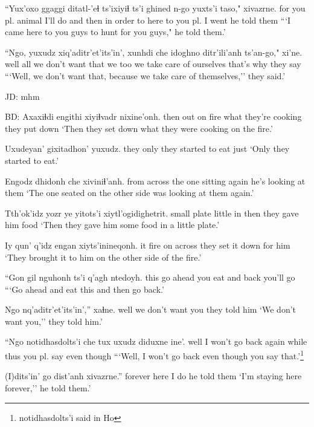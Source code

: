 \documentclass[12pt]{article}
\begin{document}
\gll ``Yux'oxo     ggaggi ditatl-'eɬ ts'ixiyiɬ {ts'i ghined} n-go yuxts'i    taso," xivazrne.
 {for you pl.} animal {I'll do}    {and then}    {in order to}      here {to you pl.} {I went} {he told them}
\glt ```I came here to you guys to hunt for you guys," he told them.'
\glend

\gll ``Ngo, yuxudz xiq'aditr'et'its'in', xunhdi che {idoghno ditr'ili'anh}      ts'an-go," xi'ne.
 well all    {we don't want that}   we     too {we take care of ourselves} {that's why} {they say}
\glt ```Well, we don't want that, because we take care of themselves,'' they said.'
\glend 

JD:  mhm

BD:
\gll Axaxiɬdi engithi  xiyiɬvadr            nixine'onh.
then   {out on fire} {what they're cooking} {they put down}
\glt `Then they set down what they were cooking on the fire.'
\glend

\gll Uxudeyan'    gixitadhon'         yuxudz.
{they only} {they started to eat} just   
\glt `Only they started to eat.'
\glend

\gll Engodz      dhidonh         che   xiviniɬ'anh.
{from across} {the one sitting} again {he's looking at them}
\glt `The one seated on the other side was looking at them again.'
\glend

\gll Tth'ok'idz  yozr   ye yitots'i xiytl'ogidighetrit.
{small plate} little in then     {they gave him food}
\glt `Then they gave him some food in a little plate.'
\glend

\gll Iy qun' q'idz engan  xiyts'inineqonh.
it fire on    across {they set it down for him}
\glt `They brought it to him on the other side of the fire.'
\glend

\gll ``Gon  gil      nguhonh ts'i q'agh ntedoyh.
this {go ahead} {you eat} and  back  {you'll go}
\glt ```Go ahead and eat this and then go back.'
\glend

\gll Ngo  nq'aditr'et'its'in','' xaɬne.
well {we don't want you}   {they told him}
\glt `We don't want you,'' they told him.'
\glend

\gll ``Ngo  notidhasdolts'i che   tux   uxudz diduxne     ine'.
well {I won't go back}    again while thus  {you pl. say} {even though}
\glt ```Well, I won't go back even though you say that.'\footnote{notidhasdolts'i said in Ho}
\glend

\gll (I)dits'in' go   dist'anh xivazrne.''
forever   here {I do}     {he told them}
\glt `I'm staying here forever,'' he told them.'
\glend
\end{document}
